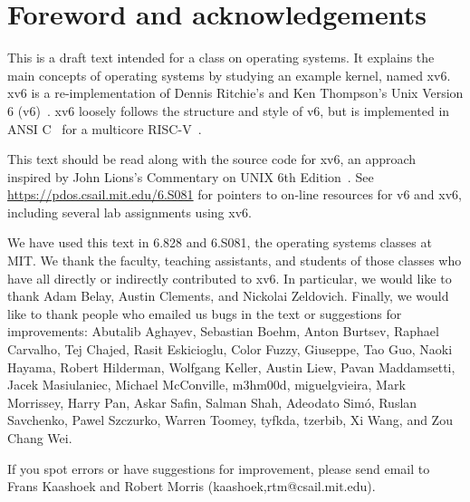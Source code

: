 \chapter*{Foreword and acknowledgements}


This is a draft text intended for a class on operating systems. It
explains the main concepts of operating systems by studying an example
kernel, named xv6.  xv6 is a re-implementation of Dennis Ritchie's and
Ken Thompson's Unix Version 6 (v6)~\cite{unix}.  xv6 loosely follows the structure
and style of v6, but is implemented in ANSI C~\cite{kernighan} for 
a multicore RISC-V~\cite{riscv}.

This text should be read along with the source code for xv6, an approach 
inspired by John Lions's Commentary on UNIX 6th Edition~\cite{lions}. See
\url{https://pdos.csail.mit.edu/6.S081} for pointers to on-line
resources for v6 and xv6, including several lab assignments
using xv6.

We have used this text in 6.828 and 6.S081, the operating systems
classes at MIT.  We thank the faculty, teaching assistants, and
students of those classes who have all directly or indirectly
contributed to xv6.  In particular, we would like to thank Adam Belay,
Austin Clements, and Nickolai Zeldovich.  Finally, we would like to
thank people who emailed us bugs in the text or suggestions for
improvements: Abutalib Aghayev, Sebastian Boehm, Anton Burtsev,
Raphael Carvalho, Tej Chajed, Rasit Eskicioglu, Color Fuzzy, Giuseppe,
Tao Guo, Naoki Hayama, Robert Hilderman, Wolfgang Keller, Austin Liew,
Pavan Maddamsetti, Jacek Masiulaniec, Michael McConville, m3hm00d,
miguelgvieira, Mark Morrissey, Harry Pan, Askar Safin, Salman Shah,
Adeodato Simó, Ruslan Savchenko, Pawel Szczurko, Warren Toomey,
tyfkda, tzerbib, Xi Wang, and Zou Chang Wei.

If you spot errors or have suggestions for improvement, please send email to
Frans Kaashoek and Robert Morris (kaashoek,rtm@csail.mit.edu).
